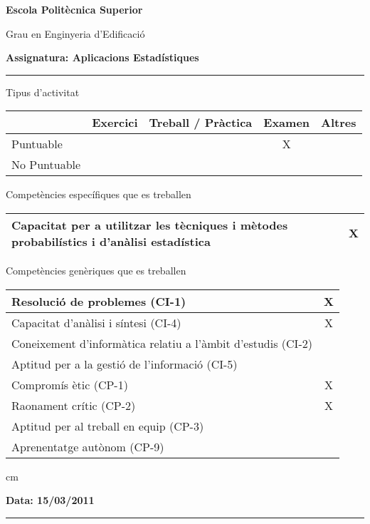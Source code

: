 \documentclass[a4paper,10pt]{article}
\begin{document}
\noindent
{\large \bf Escola Politècnica Superior}

\noindent
{\large Grau en Enginyeria d'Edificació}

\vskip 0.3cm
\noindent
{\large \bf Assignatura: Aplicacions Estadístiques}

\hrule

\vskip 0.3cm

\noindent
Tipus d'activitat

\begin{tabular}{|l|c|c|c|c|}
\hline
 & Exercici & Treball / Pràctica & Examen & Altres \\
\hline
Puntuable & & & X & \\ \hline
No Puntuable & & & & \\ \hline
\end{tabular}

\vskip 0.3cm

\noindent
Competències específiques que es treballen

\begin{tabular}{|l|c|}
\hline
Capacitat per a utilitzar les tècniques i mètodes probabilístics i d'anàlisi estadística & X \\
\hline
\end{tabular}

\vskip 0.3cm

\noindent
Competències genèriques que es treballen

\begin{tabular}{|l|c|}
\hline
Resolució de problemes (CI-1) & X \\ \hline
Capacitat d'anàlisi i síntesi (CI-4) & X \\ \hline
Coneixement d'informàtica relatiu a l'àmbit d'estudis (CI-2) & \\ \hline
Aptitud per a la gestió de l'informació (CI-5) & \\ \hline
Compromís ètic (CP-1) & X \\ \hline
Raonament crític (CP-2) & X \\ \hline
Aptitud per al treball en equip (CP-3) & \\ \hline
Aprenentatge autònom (CP-9) & \\ \hline
\end{tabular}


 cm

\noindent
\textbf{Data: 15/03/2011}

\hrule

\vspace{0.3 cm}
\end{document}
